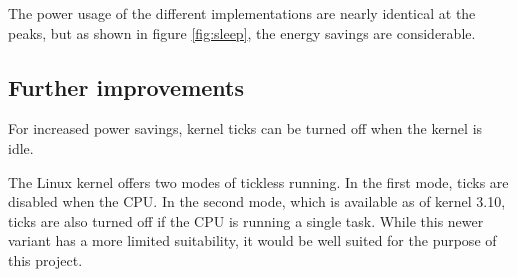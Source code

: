The power usage of the different implementations are nearly identical at the
peaks, but as shown in figure \ref{fig:sleep}, the energy savings are
considerable.

\subsection{Further improvements}

For increased power savings, kernel ticks can be turned off when the kernel is
idle\footnotemark.


The Linux kernel offers two modes of tickless running. In the first mode, ticks
are disabled when the CPU. In the second mode, which is available as of kernel
3.10, ticks are also turned off if the CPU is running a single task. While this
newer variant has a more limited suitability, it would be well suited for the
purpose of this project.
